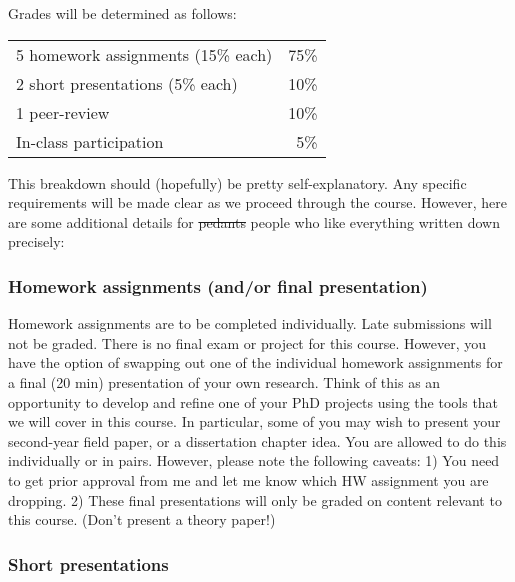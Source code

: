 \documentclass[12]{article}
\begin{document}
Grades will be determined as follows:

\begin{table}[!h] \centering 
	\label{tab:grades} 
	\begin{tabularx}{0.5\textwidth}{Xr} 
		\toprule
		5 \times homework assignments (15\% each)	& 75\% \\
		2 \times short presentations (5\% each)		& 10\% \\
		1 \times peer-review						& 10\% \\
		In-class participation						& 5\% \\
		\bottomrule
	\end{tabularx} 
\end{table} 

This breakdown should (hopefully) be pretty self-explanatory. Any specific requirements will be made clear as we proceed through the course. However, here are some additional details for \sout{pedants} people who like everything written down precisely:

\vspace{-0.25cm}
\subsubsection*{Homework assignments (and/or final presentation)}

Homework assignments are to be completed individually. Late submissions will not be graded. There is no final exam or project for this course. However, you have the option of swapping out one of the individual homework assignments for a final (20 min) presentation of your own research. Think of this as an opportunity to develop and refine one of your PhD projects using the tools that we will cover in this course. In particular, some of you may wish to present your second-year field paper, or a dissertation chapter idea. You are allowed to do this individually or in pairs. However, please note the following caveats: 1) You need to get prior approval from me and let me know which HW assignment you are dropping. 2) These final presentations will only be graded on content relevant to this course. (Don't present a theory paper!)

\vspace{-0.25cm}
\subsubsection*{Short presentations}
\end{document}
